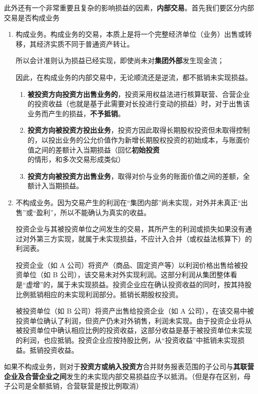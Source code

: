 \documentclass[UTF8,12pt]{ctexart}
\numberwithin{equation}{section} %
\numberwithin{figure}{section}
\numberwithin{table}{section}
\begin{document}
	此外还有一个非常重要且复杂的影响损益的因素，\textbf{内部交易}。首先我们要区分内部交易是否构成业务
	\begin{enumerate}
		\item 构成业务。构成业务的交易，本质上是将一个完整经济单位（业务）出售或转移，其经济实质不同于普通资产转让。
		
		所以会计准则认为损益已经实现，即使尚未对\textbf{集团外部}发生现金流；
		
		因此，在构成业务的内部交易中，无论顺流还是逆流，都不抵销未实现损益。
		\begin{enumerate}
			\item \textbf{被投资方向投资方出售业务的}，投资采用权益法进行核算联营、合营企业的投资收益（也就是基于此需要对长投进行变动的损益）时，对于出售该业务而产生的损益，\textbf{不予抵销}。
			
			\item \textbf{投资方向被投资方投出业务}，投资方因此取得长期股权投资但未取得控制的，以投出业务的公允价值作为新增长期股权投资的初始成本，与账面价值之间的差额计入当期损益（回忆\textbf{初始投资}的情形，和多次交易形成类似）
			
			\item \textbf{投资方向被投资方出售业务}，取得对价与业务的账面价值之间的差额，全额计入当期损益。
		\end{enumerate}
		
		\item 不构成业务。因为交易产生的利润在“集团内部”尚未实现，对外并未真正“出售”或“盈利”，所以不能确认为真实的收益。
		
		投资企业与其被投资单位之间发生的交易，其所产生的利润或损失如果没有通过对外第三方实现，就属于未实现损益，不应计入合并（或权益法核算下）的利润表。
		
		投资企业（如 A 公司）将资产（商品、固定资产等）以利润价格出售给被投资单位（如 B 公司），该交易未对外实现利润。这部分利润从集团整体看是“虚增”的，属于未实现损益。投资企业应在确认投资收益的同时，按其持股比例抵销相应的未实现利润部分。抵销长期股权投资。
		
		被投资单位（如 B 公司）将资产出售给投资企业（如 A 公司），在该交易中被投资单位确认了利润，但资产仍未对外销售，利润未实现。由于投资企业将从被投资单位中确认相应比例的投资收益，这部分收益是基于被投资单位未实现的利润，也应抵销。投资企业应按持股比例，从“投资收益”中抵销未实现损益。抵销投资收益。
	\end{enumerate}	
	
	如果不构成业务，则对于\textbf{投资方或纳入投资方}合并财务报表范围的子公司与\textbf{其联营企业及合营企业之间}发生的未实现内部交易损益应予以抵消。（但是存在区别，母子公司是全额抵销，合营联营是按比例取消）
	
\end{document}
